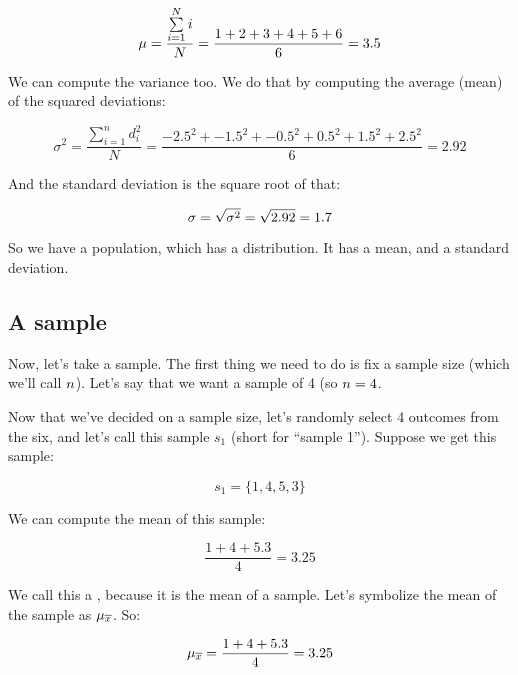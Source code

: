 \documentclass[../../../main.tex]{subfiles}
\begin{document}
\begin{equation*}
  \mu = \frac{\sum\limits_{i=1}^{N} i}{N} = \frac{1 + 2 + 3 + 4 + 5 + 6}{6} = 3.5
\end{equation*}

\noindent
We can compute the variance too. We do that by computing the average (mean) of the squared deviations:

\begin{equation*}
  \sigma^{2} = \frac{\sum\limits_{i=1}^{n} d^{2}_{i} }{N} = \frac{-2.5^{2} + -1.5^{2} + -0.5^{2} + 0.5^{2} + 1.5^{2} + 2.5^{2}}{6} = 2.92
\end{equation*}

\noindent
And the standard deviation is the square root of that:

\begin{equation*}
  \sigma = \sqrt{\sigma^{2}} = \sqrt{2.92} = 1.7
\end{equation*}

\noindent
So we have a population, which has a distribution. It has a mean, and a standard deviation.


\subsection{A sample}

Now, let's take a sample. The first thing we need to do is fix a sample size (which we'll call $\samplesize/$). Let's say that we want a sample of 4 (so $\samplesize/ = 4$. 

Now that we've decided on a sample size, let's randomly select 4 outcomes from the six, and let's call this sample $s_{1}$ (short for ``sample 1''). Suppose we get this sample:

\begin{equation*}
  s_{1} = \{ 1, 4, 5, 3 \}
\end{equation*}

\noindent
We can compute the mean of this sample:

\begin{equation*}
  \frac{1 + 4 + 5. 3}{4} = 3.25
\end{equation*}

\noindent
We call this a , because it is the mean of a sample. Let's symbolize the mean of the sample as $\SamplingMean/$. So: 

\begin{equation*}
  \SamplingMean/ = \frac{1 + 4 + 5. 3}{4} = 3.25
\end{equation*}
\end{document}
